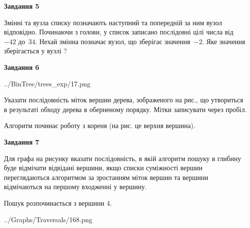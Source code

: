 \documentclass[12pt, ukrainian]{article}
\begin{document}
{\begin {large}
{\begin {center}\textbf{Завдання 5}\end {center}}\par
Змінні  та  вузла списку позначають наступний та попередній за ним вузол відповідно. Починаючи з голови, у список записано послідовні цілі числа від~$-42$ до~$34$. Нехай змінна  позначає вузол, що зберігає значення~$-2$.
Яке значення зберігається у вузлі  ?\par
\newpage

{\begin {center}\textbf{Завдання 6}\end {center}}\par

\begin{center}
	{../BinTree/trees_exp/17.png}
\end{center}
Указати послідовність міток вершин дерева, зображеного на рис., що утвориться в результаті обходу дерева в оберненому порядку. Мітки записувати через пробіл.\par Алгоритм починає роботу з кореня (на рис. це верхня вершина).\par
\newpage

{\begin {center}\textbf{Завдання 7}\end {center}}\par
Для графа на рисунку вказати послідовність, в якій алгоритм пошуку в глибину буде відмічати відвідані вершини, якщо списки суміжності вершин переглядаються алгоритмом за зростанням міток вершин та вершини відмічаються на першому вход\-женні у вершину.\par
Пошук розпочинається з вершини 4.\par

\begin{center}
	{../Graphs/Traversals/168.png}
\end{center}\par
\newpage


\end{large}}
\end{document}

